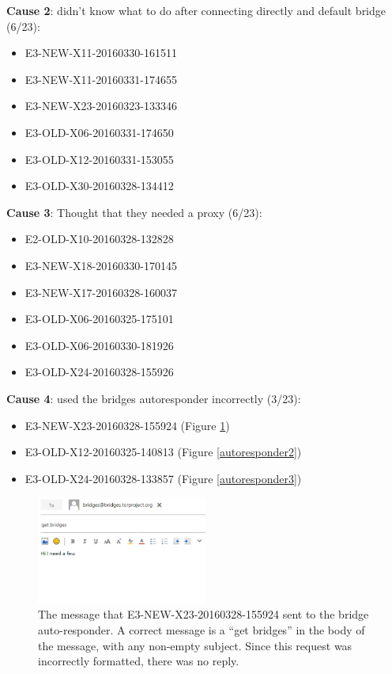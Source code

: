 \documentclass[USenglish,oneside,twocolumn]{article}
\begin{document}
{\bfseries Cause 2}: didn't know what to do after connecting directly and default bridge (6/23): 
\begin{itemize}
\item E3-NEW-X11-20160330-161511
\item E3-NEW-X11-20160331-174655
\item E3-NEW-X23-20160323-133346
\item E3-OLD-X06-20160331-174650
\item E3-OLD-X12-20160331-153055
\item E3-OLD-X30-20160328-134412
\end{itemize} 

{\bfseries Cause 3}: Thought that they needed a proxy (6/23): 
\begin{itemize}
\item E2-OLD-X10-20160328-132828
\item E3-NEW-X18-20160330-170145
\item E3-NEW-X17-20160328-160037
\item E3-OLD-X06-20160325-175101
\item E3-OLD-X06-20160330-181926
\item E3-OLD-X24-20160328-155926
\end{itemize} 

{\bfseries Cause 4}: used the bridges autoresponder incorrectly (3/23): 
\begin{itemize}
\item E3-NEW-X23-20160328-155924 (Figure \ref{autoresponder1})
\item E3-OLD-X12-20160325-140813 (Figure \ref{autoresponder2})
\item E3-OLD-X24-20160328-133857 (Figure \ref{autoresponder3})
\end{itemize}   

\begin{figure}[h]
\label{autoresponder1}
\includegraphics[width=0.5\textwidth]{../experiment/processing/failed-participants/20160325-140813-bridgeresponder-redacted.png}
\caption{The message that E3-NEW-X23-20160328-155924 sent to the bridge auto-responder. A correct message is a ``get bridges'' in the body of the message, with any non-empty subject. Since this request was incorrectly formatted, there was no reply.}
\end{figure} 
\end{document}

